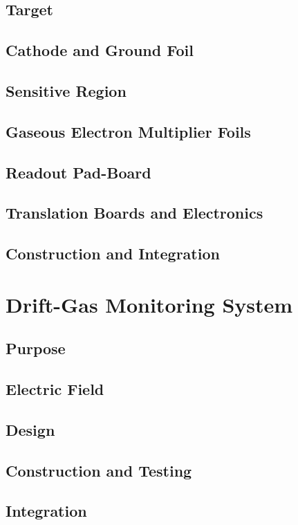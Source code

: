 \subsection{Target}
\subsection{Cathode and Ground Foil}
\subsection{Sensitive Region}
\subsection{Gaseous Electron Multiplier Foils}
\subsection{Readout Pad-Board}
\subsection{Translation Boards and Electronics}
\subsection{Construction and Integration}

\section{Drift-Gas Monitoring System}
\label{sec:dms}
\subsection{Purpose}
\subsection{Electric Field}
\subsection{Design}
\subsection{Construction and Testing}
\subsection{Integration}

